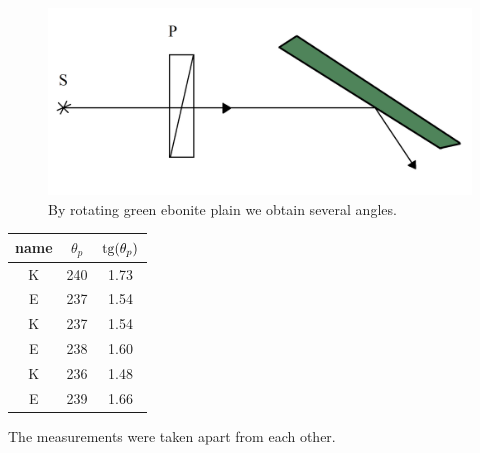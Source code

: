 \begin{minipage}{0.55\textwidth}
    \begin{figure}[h]
    \centering
    \includegraphics[width=1\textwidth]{images/ebonit.png}
    \caption{By rotating green ebonite plain we obtain several angles.}
\end{figure}
\end{minipage}
\hfill
\begin{minipage}{0.35\textwidth}
	\begin{center}
	\begin{tabular}{ |c|c|c| } 
		\hline
		name & $\theta_p$ & $\mathop{\mathrm{tg}}\nolimits(\theta_p)$ \\
 		\hline
 		K & 240 & 1.73 \\ 
 		E & 237 & 1.54 \\ 
 		K & 237 & 1.54 \\ 
 		E & 238 & 1.60 \\ 
 		K & 236 & 1.48 \\ 
 		E & 239 & 1.66 \\ 
 		\hline
	\end{tabular}
	\end{center}
	The measurements were taken apart from each other.
\end{minipage}

